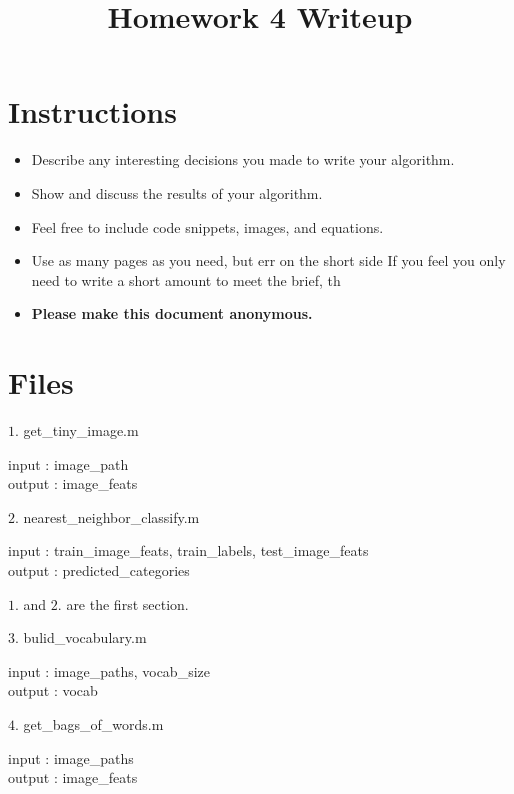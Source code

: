 \title{\vspace{-1cm}Homework 4 Writeup}



\maketitle
\vspace{-3cm}
\thispagestyle{fancy}

\section*{Instructions}
\begin{itemize}
  \item Describe any interesting decisions you made to write your algorithm.
  \item Show and discuss the results of your algorithm.
  \item Feel free to include code snippets, images, and equations.
  \item Use as many pages as you need, but err on the short side If you feel you only need to write a short amount to meet the brief, th
  
  \item \textbf{Please make this document anonymous.}
\end{itemize}
\newcommand\tab[1][1cm]{\hspace*{#1}}
\section*{Files}

{\large $1.$ get\_tiny\_image.m \par}
\tab input : image\_path \\
\tab output : image\_feats 

{\large $2.$ nearest\_neighbor\_classify.m \par}
\tab input : train\_image\_feats, train\_labels, test\_image\_feats \\
\tab output : predicted\_categories 

\tab $1.$ and $2.$ are the first section.\\

{\large $3.$ bulid\_vocabulary.m \par}
\tab input : image\_paths, vocab\_size \\
\tab output : vocab

{\large $4.$ get\_bags\_of\_words.m \par}
\tab input : image\_paths \\
\tab output :  image\_feats 

